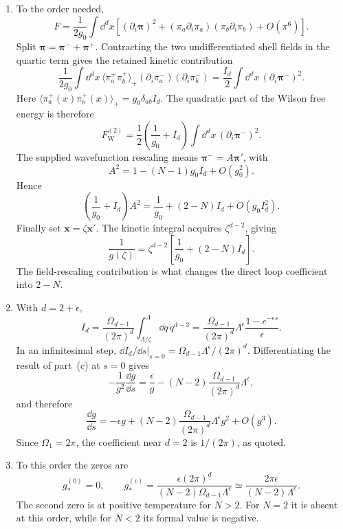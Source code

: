 \begin{enumerate}
\begin{enumerate}
    \item[(c)] To the order needed,
    \[
      F=\frac{1}{2g_0}\int \dd^dx\left[
        (\partial_i\boldsymbol\pi)^2
        +(\pi_a\partial_i\pi_a)(\pi_b\partial_i\pi_b)
        +O(\pi^6)
      \right].
    \]
    Split \(\boldsymbol\pi=\boldsymbol\pi^-+\boldsymbol\pi^+\).
    Contracting the two undifferentiated shell fields in the quartic term
    gives the retained kinetic contribution
    \[
      \frac{1}{2g_0}\int \dd^dx\,
        \bigl\langle\pi_a^+\pi_b^+\bigr\rangle_+
        (\partial_i\pi_a^-)(\partial_i\pi_b^-)
      =\frac{I_d}{2}\int \dd^dx\,
        (\partial_i\boldsymbol\pi^-)^2.
    \]
    Here
    \(\langle\pi_a^+(x)\pi_b^+(x)\rangle_+
      =g_0\delta_{ab}I_d\).
    The quadratic part of the Wilson free energy is therefore
    \[
      F_{\mathrm W}^{(2)}
      =\frac12\left(\frac{1}{g_0}+I_d\right)
        \int \dd^dx\,(\partial_i\boldsymbol\pi^-)^2.
    \]
    The supplied wavefunction rescaling means
    \(\boldsymbol\pi^-=A\boldsymbol\pi'\), with
    \[
      A^2=1-(N-1)g_0I_d+O(g_0^2).
    \]
    Hence
    \[
      \left(\frac{1}{g_0}+I_d\right)A^2
      =\frac{1}{g_0}+(2-N)I_d+O(g_0I_d^2).
    \]
    Finally set \(\mathbf x=\zeta\mathbf x'\).  The kinetic integral
    acquires \(\zeta^{d-2}\), giving
    \[
      \boxed{
      \frac{1}{g(\zeta)}=\zeta^{d-2}\left[
        \frac{1}{g_0}+(2-N)I_d
      \right].}
    \]
    The field-rescaling contribution is what changes the direct loop
    coefficient into \(2-N\).

    \item[(d)] With \(d=2+\epsilon\),
    \[
      I_d=\frac{\Omega_{d-1}}{(2\pi)^d}
        \int_{\Lambda/\zeta}^{\Lambda}\dd q\,q^{d-3}
      =\frac{\Omega_{d-1}}{(2\pi)^d}
        \Lambda^\epsilon\frac{1-e^{-\epsilon s}}{\epsilon}.
    \]
    In an infinitesimal step,
    \(\dd I_d/\dd s|_{s=0}
      =\Omega_{d-1}\Lambda^\epsilon/(2\pi)^d\).  Differentiating the
    result of part~(c) at \(s=0\) gives
    \[
      -\frac{1}{g^2}\frac{\dd g}{\dd s}
      =\frac{\epsilon}{g}
       -(N-2)\frac{\Omega_{d-1}}{(2\pi)^d}\Lambda^\epsilon,
    \]
    and therefore
    \[
      \boxed{
      \frac{\dd g}{\dd s}=-\epsilon g
       +(N-2)\frac{\Omega_{d-1}}{(2\pi)^d}
        \Lambda^\epsilon g^2+O(g^3).}
    \]
    Since \(\Omega_1=2\pi\), the coefficient near \(d=2\) is
    \(1/(2\pi)\), as quoted.

    \item[(e)] To this order the zeros are
    \[
      \boxed{g_*^{(0)}=0,\qquad
      g_*^{(c)}=
        \frac{\epsilon(2\pi)^d}
        {(N-2)\Omega_{d-1}\Lambda^\epsilon}
        \simeq\frac{2\pi\epsilon}
        {(N-2)\Lambda^\epsilon}.}
    \]
    The second zero is at positive temperature for \(N>2\).  For
    \(N=2\) it is absent at this order, while for \(N<2\) its formal value
    is negative.


\end{enumerate}
\end{enumerate}
